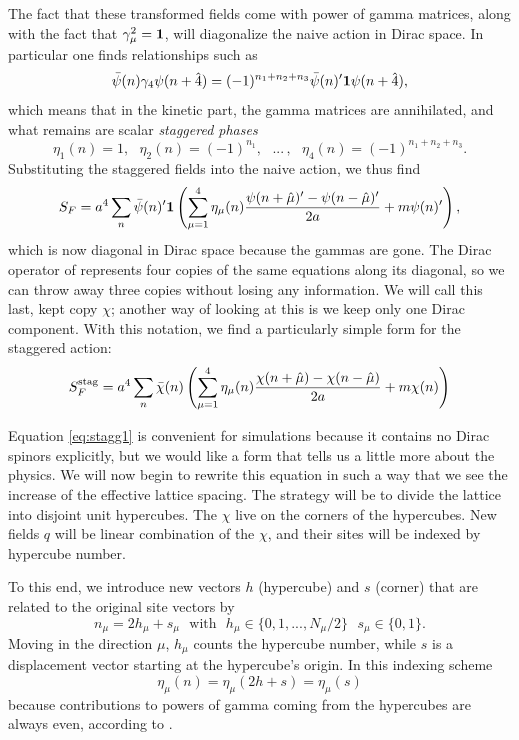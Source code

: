 The fact that these transformed fields come with power of gamma matrices,
along with the fact that $\gamma_\mu^2={\mathbf 1}$, will
diagonalize the naive action in Dirac space. In particular one finds
relationships such as
\begin{equation}
  \bar{\psi}(n)\gamma_4\psi(n+\hat{4})
      =(-1)^{n_1+n_2+n_3}\bar{\psi}(n)'{\mathbf 1}\psi(n+\hat{4}),
\end{equation}
which means that in the kinetic part, the gamma matrices are annihilated,
and what remains are scalar {\it staggered phases}
\begin{equation}\label{eq:staggeredPhase}
   \eta_1(n)=1, ~~~
   \eta_2(n)=(-1)^{n_1}, ~~~
   ...\,, ~~~
   \eta_4(n)=(-1)^{n_1+n_2+n_3}.
\end{equation}
Substituting the staggered fields
into the naive action, we thus find
\begin{equation}\label{eq:SFdiag}
   S_F
     =a^4\sum_n\bar{\psi}(n)'{\mathbf 1}\left(\sum_{\mu=1}^4\eta_\mu(n)
       \frac{\psi(n+\hat{\mu})'-\psi(n-\hat{\mu})'}{2a}
       +m\psi(n)'\right),
\end{equation}
which is now diagonal in Dirac space because the gammas are gone.
The Dirac operator of  represents four copies of
the same equations along its diagonal, so we can throw away three copies
without losing any information. We will call this last, kept copy $\chi$;
another way of looking at this is we keep only one Dirac component.
With this notation, we find a particularly simple form for the staggered
action:
\begin{equation}\label{eq:stagg1}
  S_F^{\rm stag}
     =a^4\sum_n\bar{\chi}(n)\left(\sum_{\mu=1}^4\eta_\mu(n)
       \frac{\chi(n+\hat{\mu})-\chi(n-\hat{\mu})}{2a}
       +m\chi(n)\right)
\end{equation}

Equation \eqref{eq:stagg1} is convenient for simulations because it contains no
Dirac spinors explicitly, but we would like a form that tells us a little
more about the physics. We will now begin to rewrite this equation in such
a way that we see the increase of the effective lattice spacing. The
strategy will be to divide the lattice into disjoint unit hypercubes.
The $\chi$ live on the corners of the hypercubes. New fields $q$ will be 
linear combination of the $\chi$, and their sites will be indexed by 
hypercube number.

To this end, we introduce new vectors $h$ (hypercube) and $s$ (corner) that
are related to the original site vectors by
\begin{equation}\label{eq:hypercubeIndex}
  n_\mu=2h_\mu+s_\mu~~~\text{with}~~~h_\mu\in\{0, 1, ..., N_\mu/2\}
                    ~~~s_\mu\in\{0,1\}.
\end{equation}
Moving in the direction $\mu$, $h_\mu$ counts the hypercube number,
while $s$ is a displacement vector starting at the hypercube's origin.
In this indexing scheme
\begin{equation}
  \eta_\mu(n)=\eta_\mu(2h+s)=\eta_\mu(s)
\end{equation}
because contributions to powers of gamma coming from the hypercubes are
always even, according to .

